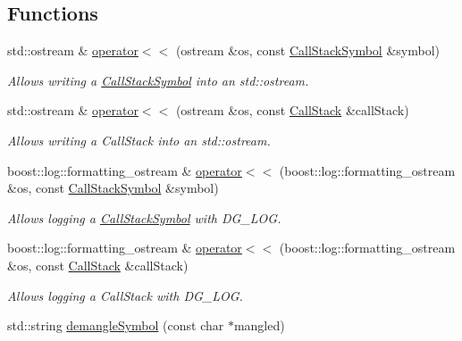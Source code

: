 \subsection*{Functions}
\begin{DoxyCompactItemize}
\item 
std\+::ostream \& \hyperlink{group___utility_module_gafa131d4872913d78dd09474524e54de3}{operator$<$$<$} (ostream \&os, const \hyperlink{structdg_1_1deepcore_1_1_call_stack_symbol}{Call\+Stack\+Symbol} \&symbol)
\begin{DoxyCompactList}\small\item\em Allows writing a \hyperlink{structdg_1_1deepcore_1_1_call_stack_symbol}{Call\+Stack\+Symbol} into an std\+::ostream. \end{DoxyCompactList}\item 
std\+::ostream \& \hyperlink{group___utility_module_ga0e3995beecca99ed6a56bbd006d778cf}{operator$<$$<$} (ostream \&os, const \hyperlink{group___utility_module_gabdf2d70ae3aab3c57142eddec69a725c}{Call\+Stack} \&call\+Stack)
\begin{DoxyCompactList}\small\item\em Allows writing a Call\+Stack into an std\+::ostream. \end{DoxyCompactList}\item 
boost\+::log\+::formatting\+\_\+ostream \& \hyperlink{group___utility_module_ga97adfcc9f917f8bd42421eaa2d618ef6}{operator$<$$<$} (boost\+::log\+::formatting\+\_\+ostream \&os, const \hyperlink{structdg_1_1deepcore_1_1_call_stack_symbol}{Call\+Stack\+Symbol} \&symbol)
\begin{DoxyCompactList}\small\item\em Allows logging a \hyperlink{structdg_1_1deepcore_1_1_call_stack_symbol}{Call\+Stack\+Symbol} with D\+G\+\_\+\+L\+OG. \end{DoxyCompactList}\item 
boost\+::log\+::formatting\+\_\+ostream \& \hyperlink{group___utility_module_ga34296a075c256c17fe8ba2f1f6d18372}{operator$<$$<$} (boost\+::log\+::formatting\+\_\+ostream \&os, const \hyperlink{group___utility_module_gabdf2d70ae3aab3c57142eddec69a725c}{Call\+Stack} \&call\+Stack)
\begin{DoxyCompactList}\small\item\em Allows logging a Call\+Stack with D\+G\+\_\+\+L\+OG. \end{DoxyCompactList}\item 
std\+::string \hyperlink{group___utility_module_ga2e2dd1419bf0d4fd4b2b6db7432a5127}{demangle\+Symbol} (const char $\ast$mangled)

\end{DoxyCompactItemize}
